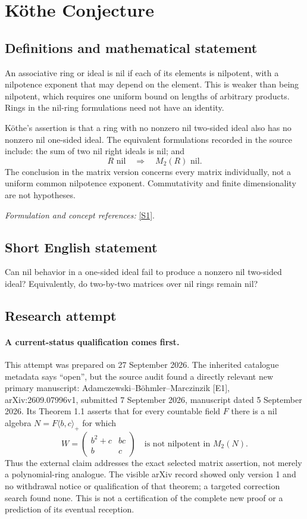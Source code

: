 \documentclass[11pt]{article}
\begin{document}
\section*{\texorpdfstring{Köthe Conjecture}{Köthe Conjecture}}\label{statement}
\subsection{Definitions and mathematical statement}
An associative ring or ideal is nil if each of its elements is nilpotent, with a nilpotence exponent that may depend on the element. This is weaker than being nilpotent, which requires one uniform bound on lengths of arbitrary products. Rings in the nil-ring formulations need not have an identity.

K\"othe's assertion is that a ring with no nonzero nil two-sided ideal also has no nonzero nil one-sided ideal. The equivalent formulations recorded in the source include: the sum of two nil right ideals is nil; and
\[
 R\text{ nil}\quad\Longrightarrow\quad M_2(R)\text{ nil}.
\]
The conclusion in the matrix version concerns every matrix individually, not a uniform common nilpotence exponent. Commutativity and finite dimensionality are not hypotheses.
\par\smallskip\textit{Formulation and concept references:} \href{https://www.mathunion.org/fileadmin/ICM/Proceedings/ICM2006.2/ICM2006.2.ocr.pdf}{[S1]}.

\subsection{Short English statement}
Can nil behavior in a one-sided ideal fail to produce a nonzero nil two-sided ideal? Equivalently, do two-by-two matrices over nil rings remain nil?
\subsection{Research attempt}
\paragraph{A current-status qualification comes first.}
This attempt was prepared on 27 September 2026. The inherited catalogue
metadata says ``open'', but the source audit found a directly relevant
new primary manuscript: Adamczewski--B\"ohmler--Marczinzik [E1],
arXiv:2609.07996v1, submitted 7 September 2026, manuscript dated
5 September 2026. Its Theorem 1.1 asserts that for every countable field
$F$ there is a nil algebra $N=F\langle b,c\rangle_+$ for which
\[
 W=\begin{pmatrix}b^2+c&bc\\ b&c\end{pmatrix}
 \quad\text{is not nilpotent in }M_2(N).
\]
Thus the external claim addresses the exact selected matrix assertion,
not merely a polynomial-ring analogue. The visible arXiv record showed
only version 1 and no withdrawal notice or qualification of that theorem;
a targeted correction search found none. This is not a certification of
the complete new proof or a prediction of its eventual reception.
\end{document}
